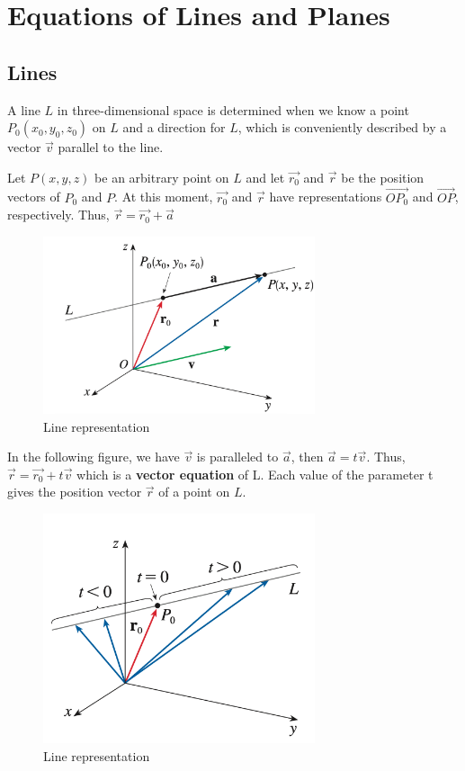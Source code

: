 \chapter{Equations of Lines and Planes}

\section{Lines}

A line $L$ in three-dimensional space is determined when we know a point $P_0(x_0, y_0, z_0)$ on $L$ and a direction for $L$, which is conveniently described by a vector $\vec{v}$ parallel to the line.

Let $P(x, y, z)$ be an arbitrary point on $L$ and let $\vec{r_0}$ and $\vec{r}$ be the position vectors of $P_0$ and $P$. At this moment, $\vec{r_0}$ and $\vec{r}$ have representations $\vec{OP_0}$ and $\vec{OP}$, respectively. Thus, $\vec{r} = \vec{r_0} + \vec{a}$

\begin{figure}
    \centering
    \includegraphics[width=8cm]{appendices/figures/fig003.png}
    \caption{Line representation}
\end{figure}

In the following figure, we have $\vec{v}$ is paralleled to $\vec{a}$, then $\vec{a} = t\vec{v}$. Thus, $\vec{r} = \vec{r_0} + t\vec{v}$ which is a \textbf{vector equation} of L. Each value of the parameter t gives the position vector $\vec{r}$ of a point on $L$.

\begin{figure}
    \centering
    \includegraphics[width=8cm]{appendices/figures/fig004.png}
    \caption{Line representation}
\end{figure}

